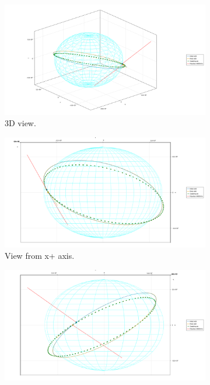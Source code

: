 \begin{figure}[htbp]
    \centering
    \begin{subfigure}{0.49\linewidth}
        \includegraphics[width=\linewidth]{../results/j2/ipv_noncop/ICI_3d.png}
        \caption{3D view.}
    \end{subfigure}
    \begin{subfigure}{0.49\linewidth}
        \includegraphics[width=\linewidth]{../results/j2/ipv_noncop/ICI_x+.png}
        \caption{View from x+ axis.}
    \end{subfigure}
    \begin{subfigure}{0.49\linewidth}
        \includegraphics[width=\linewidth]{../results/j2/ipv_noncop/ICI_y+.png}

\end{subfigure}
\end{figure}
